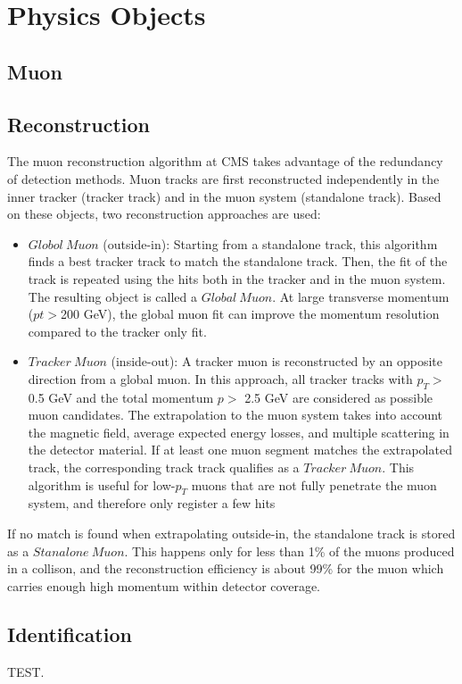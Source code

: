 \section{Physics Objects}

\subsection{Muon}
\subsection*{Reconstruction}
The muon reconstruction algorithm at CMS takes advantage of the redundancy of detection methods. Muon tracks are first reconstructed independently in the inner tracker (tracker track) and in the muon system (standalone track). Based on these objects, two reconstruction approaches are used\cite{MuonReco}:
\begin{itemize}
\item $Globol~Muon$ (outside-in): Starting from a standalone track, this algorithm finds a best tracker track to match the standalone track. Then, the fit of the track is repeated using the hits both in the tracker and in the muon system\cite{KF}. The resulting object is called a $Global~Muon$. At large transverse momentum ($pt > $200 GeV), the global muon fit can improve the momentum resolution compared to the tracker only fit.
\item $Tracker~Muon$ (inside-out): A tracker muon is reconstructed by an opposite direction from a global muon. In this approach, all tracker tracks with $p_{T} >$ 0.5 GeV and the total momentum $p >$ 2.5 GeV are considered as possible muon candidates. The extrapolation to the muon system takes into account the magnetic field, average expected energy losses, and multiple scattering in the detector material. If at least one muon segment matches the extrapolated track, the corresponding track track qualifies as a $Tracker~Muon$. This algorithm is useful for low-$p_{T}$ muons that are not fully penetrate the muon system, and therefore only register a few hits
\end{itemize}

If no match is found when extrapolating outside-in, the standalone track is stored as a $Stanalone~Muon$. This happens only for less than 1\% of the muons produced in a collison, and the reconstruction efficiency is about 99\% for the muon which carries enough high momentum within detector coverage\cite{MuonReco}.

\newpage
\subsection*{Identification}
TEST.

